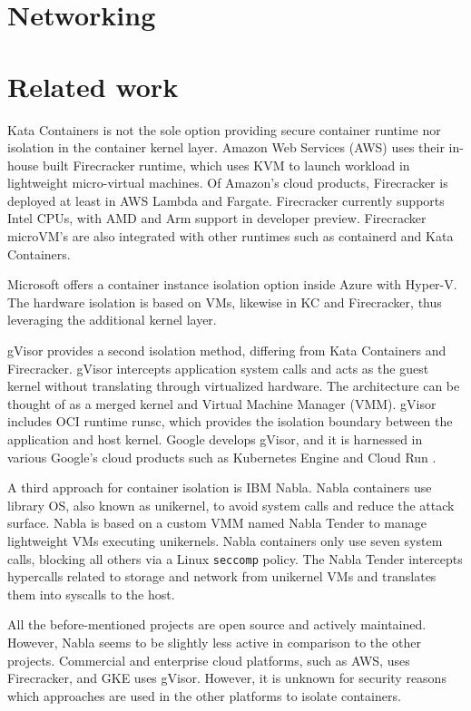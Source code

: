 \section{Networking}

\section{Related work}

Kata Containers is not the sole option providing secure container runtime nor isolation in the container kernel layer. Amazon Web Services (AWS) uses their in-house built Firecracker runtime, which uses KVM to launch workload in lightweight micro-virtual machines. Of Amazon's cloud products, Firecracker is deployed at least in AWS Lambda and Fargate. Firecracker currently supports Intel CPUs, with AMD and Arm support in developer preview. Firecracker microVM's are also integrated with other runtimes such as containerd and Kata Containers. \cite{AWS}\cite{Debab2021}\cite{FirecrackerDesign}

Microsoft offers a container instance isolation option inside Azure with Hyper-V. The hardware isolation is based on VMs, likewise in KC and Firecracker, thus leveraging the additional kernel layer. \cite{Hyper-V}

gVisor provides a second isolation method, differing from Kata Containers and Firecracker. gVisor intercepts application system calls and acts as the guest kernel without translating through virtualized hardware. The architecture can be thought of as a merged kernel and Virtual Machine Manager (VMM). gVisor includes OCI runtime runsc, which provides the isolation boundary between the application and host kernel. Google develops gVisor, and it is harnessed in various Google's cloud products such as Kubernetes Engine \cite{GKE} and Cloud Run \cite{CloudRun}. \cite{Debab2021}\cite{gVisor}

A third approach for container isolation is IBM Nabla\cite{Nabla}. Nabla containers use library OS, also known as unikernel, to avoid system calls and reduce the attack surface. Nabla is based on a custom VMM named Nabla Tender to manage lightweight VMs executing unikernels. Nabla containers only use seven system calls, blocking all others via a Linux \texttt{seccomp} policy. The Nabla Tender intercepts hypercalls related to storage and network from unikernel VMs and translates them into syscalls to the host. \cite{Debab2021}

All the before-mentioned projects are open source and actively maintained. However, Nabla seems to be slightly less active in comparison to the other projects. Commercial and enterprise cloud platforms, such as AWS, uses Firecracker, and GKE uses gVisor. However, it is unknown for security reasons which approaches are used in the other platforms to isolate containers.


